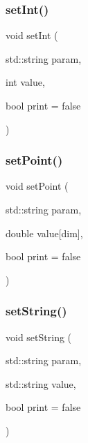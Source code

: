 \subsubsection{\texorpdfstring{setInt()}{setInt()}}
{\footnotesize\ttfamily void set\+Int (\begin{DoxyParamCaption}\item[{std\+::string}]{param,  }\item[{int}]{value,  }\item[{bool}]{print = {\ttfamily false} }\end{DoxyParamCaption})}

\mbox{\label{classparameters_class_aeb69e592e5c35d16379edd69a45af4fd}} 
\subsubsection{\texorpdfstring{setPoint()}{setPoint()}}
{\footnotesize\ttfamily void set\+Point (\begin{DoxyParamCaption}\item[{std\+::string}]{param,  }\item[{double}]{value\mbox{[}dim\mbox{]},  }\item[{bool}]{print = {\ttfamily false} }\end{DoxyParamCaption})}

\mbox{\label{classparameters_class_ab06f012067df1884ecc3a71488aa9ca3}} 
\subsubsection{\texorpdfstring{setString()}{setString()}}
{\footnotesize\ttfamily void set\+String (\begin{DoxyParamCaption}\item[{std\+::string}]{param,  }\item[{std\+::string}]{value,  }\item[{bool}]{print = {\ttfamily false} }\end{DoxyParamCaption})}

\mbox{\label{classparameters_class_a8250a061bef7ccda26e06678c8935f43}} 
